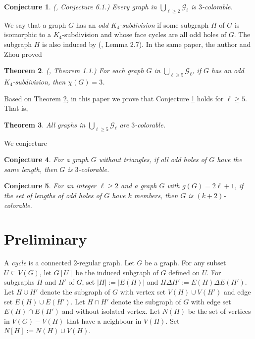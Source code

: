 \documentclass[11pt]{article}
\newtheorem{theorem}{Theorem}[section]
\newtheorem{conjecture}[theorem]{Conjecture}
\begin{document}
\begin{conjecture}\label{conj}(\cite{WD2204}, Conjecture 6.1.)
Every graph in $\bigcup_{\ell\geq2}\mathcal{G}_{\ell}$ is $3$-colorable.
\end{conjecture}

We say that a graph $G$ has an {\em odd $K_4$-subdivision} if some subgraph $H$ of $G$ is isomorphic to a $K_4$-subdivision and whose face cycles are all odd holes of $G$. The subgraph $H$ is also induced by (\cite{CZ22}, Lemma 2.7). In the same paper, the author and Zhou proved

\begin{theorem}\label{ex-odd K4}(\cite{CZ22}, Theorem 1.1.)
For each graph $G$ in $\bigcup_{\ell\geq5}\mathcal{G}_{\ell}$, if $G$ has an odd $K_4$-subdivision, then $\chi(G)=3$.
\end{theorem}

Based on Theorem \ref{ex-odd K4}, in this paper we prove that Conjecture \ref{conj} holds for $\ell\geq5$. That is,

\begin{theorem}\label{main thm}
All graphs in $\bigcup_{\ell\geq5}\mathcal{G}_{\ell}$ are $3$-colorable.
\end{theorem}


We conjecture
\begin{conjecture}\label{conj2}
For a graph $G$ without triangles, if all odd holes of $G$ have the same length, then $G$  is $3$-colorable.
\end{conjecture}

\begin{conjecture}\label{conj2}
For an integer $\ell\geq2$ and a graph $G$ with $g(G)=2\ell+1$, if the set of lengths of odd holes of $G$ have $k$ members, then $G$ is $(k+2)$-colorable.
\end{conjecture}

\section{Preliminary}
A {\em cycle} is a connected $2$-regular graph. %
Let $G$ be a graph. For any subset $U\subseteq V(G)$, let $G[U]$ be the induced subgraph of $G$ defined on $U$.
For subgraphs $H$ and $H'$ of $G$, set $|H|:=|E(H)|$ and $H\Delta H':=E(H)\Delta E(H')$.
Let $H\cup H'$ denote the subgraph of $G$ with vertex set $V(H)\cup V(H')$ and edge set $E(H)\cup E(H')$. Let $H\cap H'$ denote the subgraph of $G$ with edge set $E(H)\cap E(H')$ and without isolated vertex. Let $N(H)$ be the set of vertices in $V(G)-V(H)$ that have a neighbour in $V(H)$. Set $N[H]:=N(H)\cup V(H)$.
\end{document}

